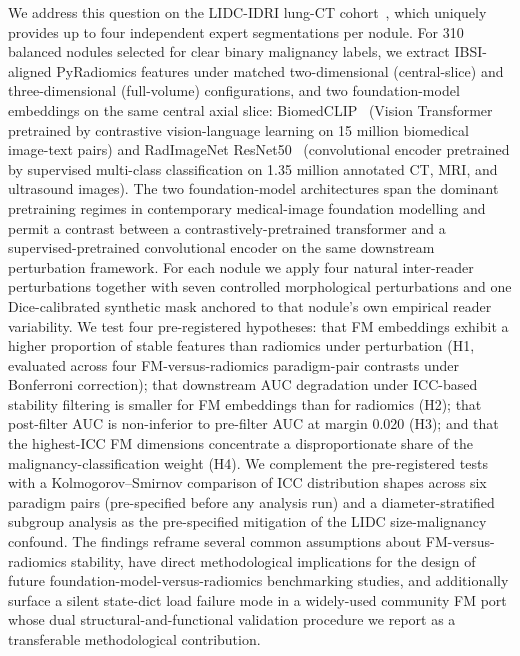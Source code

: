 We address this question on the LIDC-IDRI lung-CT cohort~\cite{armato2011}, which uniquely provides up to four independent expert segmentations per nodule. For 310 balanced nodules selected for clear binary malignancy labels, we extract IBSI-aligned PyRadiomics features under matched two-dimensional (central-slice) and three-dimensional (full-volume) configurations, and two foundation-model embeddings on the same central axial slice: BiomedCLIP~\cite{zhang2024biomedclip} (Vision Transformer pretrained by contrastive vision-language learning on 15 million biomedical image-text pairs) and RadImageNet ResNet50~\cite{mei2022radimagenet} (convolutional encoder pretrained by supervised multi-class classification on 1.35 million annotated CT, MRI, and ultrasound images). The two foundation-model architectures span the dominant pretraining regimes in contemporary medical-image foundation modelling and permit a contrast between a contrastively-pretrained transformer and a supervised-pretrained convolutional encoder on the same downstream perturbation framework. For each nodule we apply four natural inter-reader perturbations together with seven controlled morphological perturbations and one Dice-calibrated synthetic mask anchored to that nodule's own empirical reader variability. We test four pre-registered hypotheses: that FM embeddings exhibit a higher proportion of stable features than radiomics under perturbation (H1, evaluated across four FM-versus-radiomics paradigm-pair contrasts under Bonferroni correction); that downstream AUC degradation under ICC-based stability filtering is smaller for FM embeddings than for radiomics (H2); that post-filter AUC is non-inferior to pre-filter AUC at margin 0.020 (H3); and that the highest-ICC FM dimensions concentrate a disproportionate share of the malignancy-classification weight (H4). We complement the pre-registered tests with a Kolmogorov--Smirnov comparison of ICC distribution shapes across six paradigm pairs (pre-specified before any analysis run) and a diameter-stratified subgroup analysis as the pre-specified mitigation of the LIDC size-malignancy confound. The findings reframe several common assumptions about FM-versus-radiomics stability, have direct methodological implications for the design of future foundation-model-versus-radiomics benchmarking studies, and additionally surface a silent state-dict load failure mode in a widely-used community FM port whose dual structural-and-functional validation procedure we report as a transferable methodological contribution.
